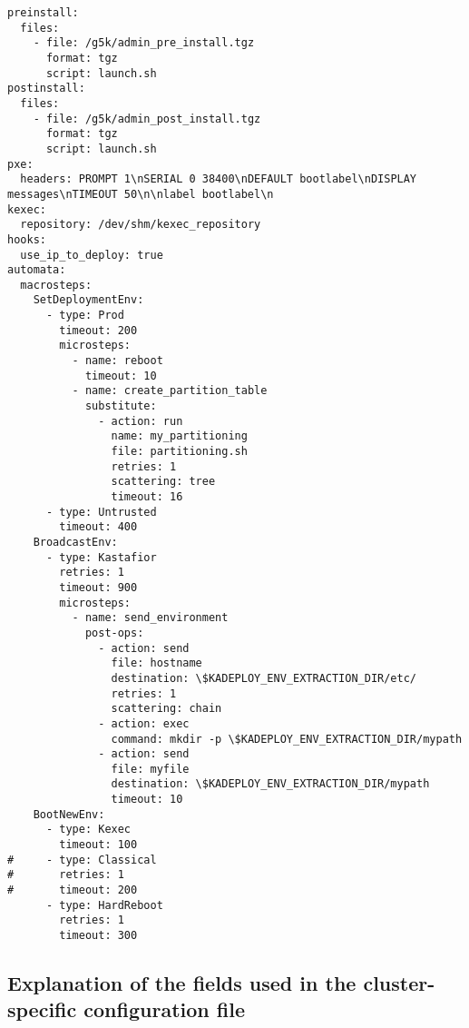 \documentclass[a4wide,10pt,oneside]{book}
\begin{document}
\begin{small}
\begin{verbatim}
preinstall: 
  files:
    - file: /g5k/admin_pre_install.tgz
      format: tgz
      script: launch.sh
postinstall: 
  files:
    - file: /g5k/admin_post_install.tgz
      format: tgz
      script: launch.sh
pxe: 
  headers: PROMPT 1\nSERIAL 0 38400\nDEFAULT bootlabel\nDISPLAY messages\nTIMEOUT 50\n\nlabel bootlabel\n
kexec:
  repository: /dev/shm/kexec_repository
hooks:
  use_ip_to_deploy: true
automata: 
  macrosteps:
    SetDeploymentEnv:
      - type: Prod
        timeout: 200
        microsteps:
          - name: reboot
            timeout: 10
          - name: create_partition_table
            substitute:
              - action: run
                name: my_partitioning
                file: partitioning.sh
                retries: 1
                scattering: tree
                timeout: 16
      - type: Untrusted
        timeout: 400
    BroadcastEnv: 
      - type: Kastafior
        retries: 1
        timeout: 900
        microsteps:
          - name: send_environment
            post-ops:
              - action: send
                file: hostname
                destination: \$KADEPLOY_ENV_EXTRACTION_DIR/etc/
                retries: 1
                scattering: chain
              - action: exec
                command: mkdir -p \$KADEPLOY_ENV_EXTRACTION_DIR/mypath
              - action: send
                file: myfile
                destination: \$KADEPLOY_ENV_EXTRACTION_DIR/mypath
                timeout: 10
    BootNewEnv: 
      - type: Kexec
        timeout: 100
#     - type: Classical
#       retries: 1
#       timeout: 200
      - type: HardReboot
        retries: 1
        timeout: 300
\end{verbatim}
\end{small}

\subsection{Explanation of the fields used in the cluster-specific configuration file\label{sec:specific_config}}
\end{document}
